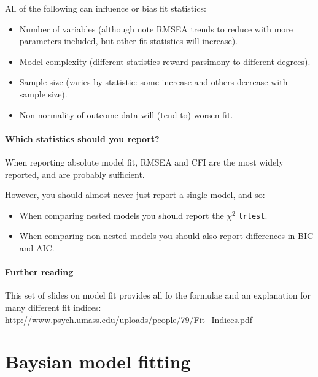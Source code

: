 \documentclass[]{article}
\providecommand{\tightlist}{%
  \setlength{\itemsep}{0pt}\setlength{\parskip}{0pt}}
\let\oldparagraph\paragraph
\renewcommand{\paragraph}[1]{\oldparagraph{#1}\mbox{}}
\theoremstyle{definition}
\theoremstyle{definition}
\theoremstyle{definition}
\theoremstyle{remark}
\begin{document}
All of the following can influence or bias fit statistics:

\begin{itemize}
\tightlist
\item
  Number of variables (although note RMSEA trends to reduce with more
  parameters included, but other fit statistics will increase).
\item
  Model complexity (different statistics reward parsimony to different
  degrees).
\item
  Sample size (varies by statistic: some increase and others decrease
  with sample size).
\item
  Non-normality of outcome data will (tend to) worsen fit.
\end{itemize}

\paragraph{Which statistics should you
report?}\label{which-statistics-should-you-report}

When reporting absolute model fit, RMSEA and CFI are the most widely
reported, and are probably sufficient.

However, you should almost never just report a single model, and so:

\begin{itemize}
\tightlist
\item
  When comparing nested models you should report the \(\chi^2\)
  \texttt{lrtest}.
\item
  When comparing non-nested models you should also report differences in
  BIC and AIC.
\end{itemize}

\paragraph{Further reading}\label{further-reading}

This set of slides on model fit provides all fo the formulae and an
explanation for many different fit indices:
\url{http://www.psych.umass.edu/uploads/people/79/Fit_Indices.pdf}

\hypertarget{bayes-mcmc}{\section{Baysian model
fitting}\label{bayes-mcmc}}
\end{document}
